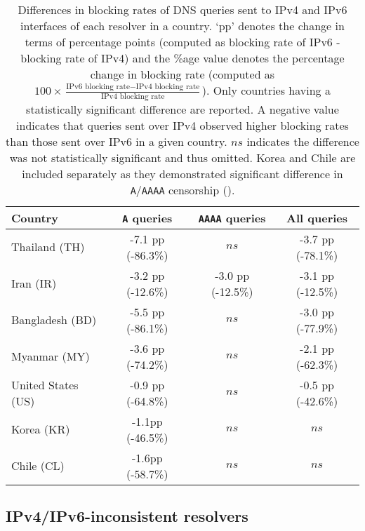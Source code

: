 \begin{table}[t]
  \centering
  \small
  \scalebox{\tabularscale} {
  \begin{tabular}{lccc}%
    \toprule
    {\bf Country}&{\bf {\tt A} queries }&{\bf {\tt AAAA} queries} & {\bf All queries}
    \\ \midrule
    Thailand (TH)      & -7.1 pp (-86.3\%) & $ns$              & -3.7 pp (-78.1\%) \\
    Iran (IR)          & -3.2 pp (-12.6\%) & -3.0 pp (-12.5\%) & -3.1 pp (-12.5\%) \\ 
    Bangladesh (BD)    & -5.5 pp (-86.1\%) & $ns$              & -3.0 pp (-77.9\%) \\
    Myanmar (MY)       & -3.6 pp (-74.2\%) & $ns$              & -2.1 pp (-62.3\%) \\
    United States (US) & -0.9 pp (-64.8\%) & $ns$              & -0.5 pp (-42.6\%) \\
    \midrule
    Korea (KR)         & -1.1pp (-46.5\%) & $ns$    & $ns$ \\
    Chile (CL)         & -1.6pp (-58.7\%)  & $ns$    & $ns$ \\
    \bottomrule
  \end{tabular}
  }
  \caption{Differences in blocking rates of DNS queries sent to IPv4 and IPv6
  interfaces of each resolver in a country. `pp' denotes the change in
  terms of percentage points (computed as blocking rate of IPv6 - blocking
  rate of IPv4) and the \%age value denotes the percentage change in blocking rate
  (computed as 
  $
  100 \times \frac{\text{IPv6 blocking rate} - \text{IPv4 blocking rate}}
  {\text{IPv4 blocking rate}}
  $). 
  Only countries having a statistically significant difference are reported. A
  negative value indicates that queries sent over IPv4 observed higher blocking
  rates than those sent over IPv6 in a given country. $ns$ indicates the
  difference was not statistically significant and thus omitted. Korea and Chile
  are included separately as they demonstrated significant difference in
  \texttt{A}/\texttt{AAAA} censorship ().}
  \label{tab:infrastructure:countries}
\end{table}

\subsection{IPv4/IPv6-inconsistent resolvers}
\label{sec:infrastructure:resolvers}
%

